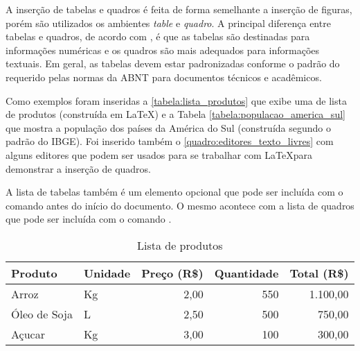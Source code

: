 \label{secao:tabelas_e_quadros}

A inserção de tabelas e quadros é feita de forma semelhante a inserção de figuras, porém são utilizados os ambientes \textit{table} e \textit{quadro}. A principal diferença entre tabelas e quadros, de acordo com , é que as tabelas são destinadas para informações numéricas e os quadros são mais adequados para informações textuais. Em geral, as tabelas devem estar padronizadas conforme o padrão do
 requerido pelas normas da ABNT para documentos técnicos e
acadêmicos.

Como exemplos foram inseridas a \autoref{tabela:lista_produtos} que exibe uma de lista de produtos (construída em \LaTeX) e a Tabela \autoref{tabela:populacao_america_sul} que mostra a população dos países da América do Sul (construída segundo o padrão do IBGE). Foi inserido também o \autoref{quadro:editores_texto_livres} com alguns editores que podem ser usados para se trabalhar com \LaTeX para demonstrar a inserção de quadros.

 A lista de tabelas também é um elemento opcional que pode ser incluída com o comando  antes do início do documento. O mesmo acontece com a lista de quadros que pode ser incluída com o comando .

\begin{table}[htb]
\centering
\caption{Lista de produtos}
\label{tabela:lista_produtos}
\begin{tabularx}{\textwidth}{X|l|r|r|r} \hline
Produto      & Unidade & Preço (R\$) & Quantidade & Total (R\$) \\ \hline
Arroz        & Kg      & 2,00        & 550        & 1.100,00    \\
Óleo de Soja & L       & 2,50        & 500        & 750,00      \\
Açucar       & Kg      & 3,00        & 100        & 300,00      \\ \hline
\end{tabularx}
\fdadospesquisa
\end{table}


